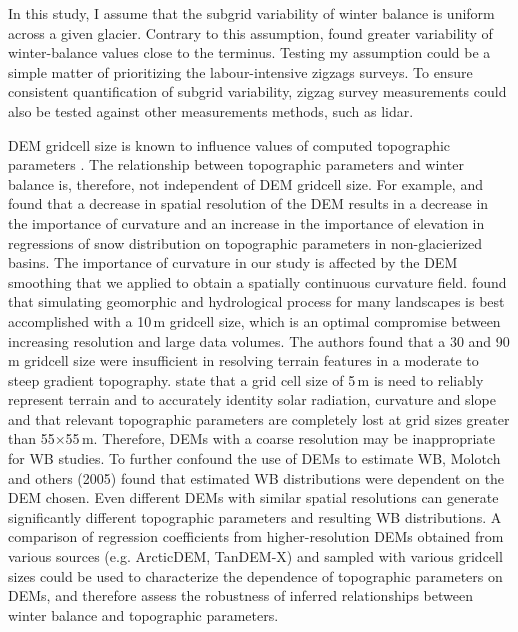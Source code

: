 \documentclass{sfuthesis}
\begin{document}
In this study, I assume that the subgrid variability of winter balance is uniform across a given glacier. Contrary to this assumption, \cite{McGrath2015} found greater variability of winter-balance values close to the terminus. Testing my assumption could be a simple matter of prioritizing the labour-intensive zigzags surveys. To ensure consistent quantification of subgrid variability, zigzag survey measurements could also be tested against other measurements methods, such as lidar. 

DEM gridcell size is known to influence values of computed topographic parameters \citep{Zhang1994, Garbrecht1994, Guo-an2001, Lopez2010}. The relationship between topographic parameters and winter balance is, therefore, not independent of DEM gridcell size. For example, \cite{Kienzle2004} and \cite{Lopez2010} found that a decrease in spatial resolution of the DEM results in a decrease in the importance of curvature and an increase in the importance of elevation in regressions of snow distribution on topographic parameters in non-glacierized basins. The importance of curvature in our study is affected by the DEM smoothing that we applied to obtain a spatially continuous curvature field. \cite{Zhang1994} found that simulating geomorphic and hydrological process for many landscapes is best accomplished with a 10\,m gridcell size, which is an optimal compromise between increasing resolution and large data volumes. The authors found that a 30 and 90 m gridcell size were insufficient in resolving terrain features in a moderate to steep gradient topography. \cite{Lopez2010} state that a grid cell size of 5\,m is need to reliably represent terrain and to accurately identity solar radiation, curvature and slope and that relevant topographic parameters are completely lost at grid sizes greater than 55$\times$55\,m. Therefore, DEMs with a coarse resolution may be inappropriate for WB studies. To further confound the use of DEMs to estimate WB, Molotch and others (2005) found that estimated WB distributions were dependent on the DEM chosen. Even different DEMs with similar spatial resolutions can generate significantly different topographic parameters and resulting WB distributions. A comparison of regression coefficients from higher-resolution DEMs obtained from various sources (e.g. ArcticDEM, TanDEM-X) and sampled with various gridcell sizes could be used to characterize the dependence of topographic parameters on DEMs, and therefore assess the robustness of inferred relationships between winter balance and topographic parameters. 
\end{document}
